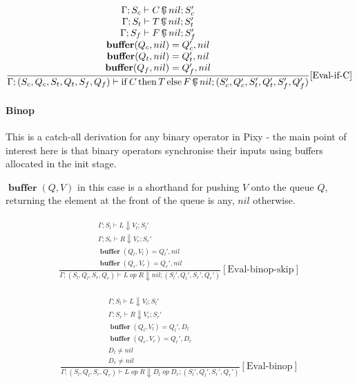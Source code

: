\documentclass{scrartcl}
\DeclareMathOperator{\ifop}{if}
\DeclareMathOperator{\thenop}{then}
\DeclareMathOperator{\elseop}{else}
\DeclareMathOperator{\ceval}{\overset{C}{\smash{\Downarrow}}}
\DeclareMathOperator{\buffer}{\mathbf{buffer}}
\begin{document}
    \begin{align*}
    \frac{
        \begin{matrix}
        \Gamma; S_c \vdash C \ceval nil; S_c' \\
        \Gamma; S_t \vdash T \ceval nil; S_t' \\
        \Gamma; S_f \vdash F \ceval nil; S_f' \\
        \buffer(Q_c, nil) = Q_c', nil \\
        \buffer(Q_t, nil) = Q_t', nil \\
        \buffer(Q_f, nil) = Q_f', nil
        \end{matrix}
    }{
        \Gamma; (S_c, Q_c, S_t, Q_t, S_f, Q_f) \vdash \ifop C \thenop T \elseop F \ceval nil; (S_c', Q_c', S_t', Q_t', S_f', Q_f')
    }[\text{Eval-if-C}]
    \end{align*}
    
    \paragraph{Binop}
    
    This is a catch-all derivation for any binary operator in Pixy - the main point of interest here is that binary operators synchronise their inputs using buffers allocated in the init stage.
    
    $\buffer(Q, V)$ in this case is a shorthand for pushing $V$ onto the queue $Q$, returning the element at the front of the queue is any, $nil$ otherwise.
    
    \begin{align*}
    \frac{
        \begin{matrix}
        \Gamma; S_l \vdash L \Downarrow V_l; S_l' \\
        \Gamma; S_r \vdash R \Downarrow V_r; S_r' \\
        \buffer(Q_l, V_l) = Q_l', nil \\
        \buffer(Q_r, V_r) = Q_r', nil
        \end{matrix}
    }{
        \Gamma; (S_l, Q_l, S_r, Q_r) \vdash L \; op \; R \Downarrow nil; (S_l', Q_l', S_r', Q_r')
    }[\text{Eval-binop-skip}]
    \end{align*}
    
    \begin{align*}
    \frac{
        \begin{matrix}
        \Gamma; S_l \vdash L \Downarrow V_l; S_l' \\
        \Gamma; S_r \vdash R \Downarrow V_r; S_r' \\
        \buffer(Q_l, V_l) = Q_l', D_l \\
        \buffer(Q_r, V_r) = Q_r', D_r \\
        D_l \neq nil \\
        D_r \neq nil
        \end{matrix}
    }{
        \Gamma; (S_l, Q_l, S_r, Q_r) \vdash L \; op \; R \Downarrow D_l \; op \; D_r; (S_l', Q_l', S_r', Q_r')
    }[\text{Eval-binop}]
    \end{align*}
    
\end{document}
